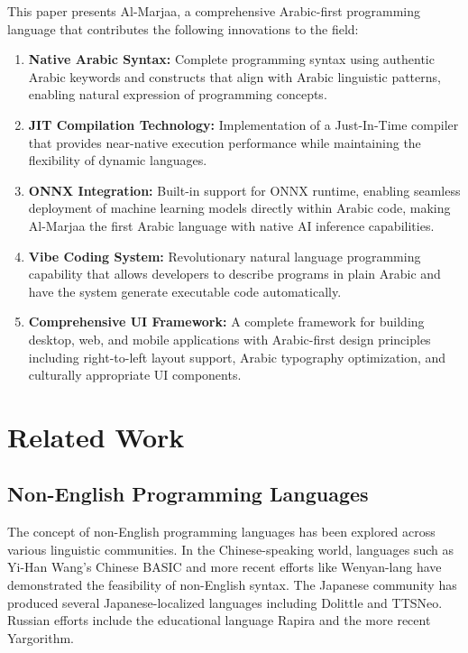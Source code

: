 \documentclass[11pt,a4paper]{article}
\begin{document}
This paper presents Al-Marjaa, a comprehensive Arabic-first programming language that contributes the following innovations to the field:

\begin{enumerate}
    \item \textbf{Native Arabic Syntax:} Complete programming syntax using authentic Arabic keywords and constructs that align with Arabic linguistic patterns, enabling natural expression of programming concepts.
    
    \item \textbf{JIT Compilation Technology:} Implementation of a Just-In-Time compiler that provides near-native execution performance while maintaining the flexibility of dynamic languages.
    
    \item \textbf{ONNX Integration:} Built-in support for ONNX runtime, enabling seamless deployment of machine learning models directly within Arabic code, making Al-Marjaa the first Arabic language with native AI inference capabilities.
    
    \item \textbf{Vibe Coding System:} Revolutionary natural language programming capability that allows developers to describe programs in plain Arabic and have the system generate executable code automatically.
    
    \item \textbf{Comprehensive UI Framework:} A complete framework for building desktop, web, and mobile applications with Arabic-first design principles including right-to-left layout support, Arabic typography optimization, and culturally appropriate UI components.
\end{enumerate}

\section{Related Work}

\subsection{Non-English Programming Languages}

The concept of non-English programming languages has been explored across various linguistic communities. In the Chinese-speaking world, languages such as Yi-Han Wang's Chinese BASIC and more recent efforts like Wenyan-lang have demonstrated the feasibility of non-English syntax. The Japanese community has produced several Japanese-localized languages including Dolittle and TTSNeo. Russian efforts include the educational language Rapira and the more recent Yargorithm.
\end{document}
